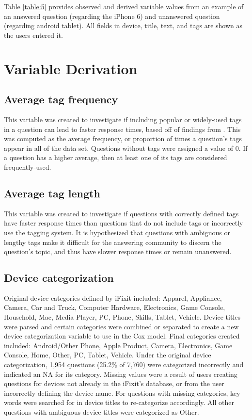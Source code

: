 \documentclass[]{interact}\usepackage[]{graphicx}\usepackage[]{color}
\begin{document}
Table \ref{table:5} provides observed and derived variable values from an example of an answered question (regarding the iPhone 6) and unanswered question (regarding android tablet). All fields in device, title, text, and tags are shown as the users entered it. 


\section{Variable Derivation}

\subsection{Average tag frequency}

This variable was created to investigate if including popular or widely-used tags in a question can lead to faster response times, based off of findings from \cite{Bhat2014}. This was computed as the average frequency, or proportion of times a question's tags appear in all of the data set. Questions without tags were assigned a value of 0.  If a question has a higher average, then at least one of its tags are considered frequently-used.


\subsection{Average tag length}

This variable was created to investigate if questions with correctly defined tags have faster response times than questions that do not include tags or incorrectly use the tagging system. It is hypothesized that questions with ambiguous or lengthy tags make it difficult for the answering community to discern the question's topic, and thus have slower response times or remain unanswered. 


\subsection{Device categorization}

Original device categories defined by iFixit included: Apparel, Appliance, Camera, Car and Truck, Computer Hardware, Electronics, Game Console, Household, Mac, Media Player, PC, Phone, Skills, Tablet, Vehicle. Device titles were parsed and certain categories were combined or separated to create a new device categorization variable to use in the Cox model. Final categories created included: Android/Other Phone, Apple Product, Camera, Electronics, Game Console, Home, Other, PC, Tablet, Vehicle. Under the original device categorization, 1,954 questions (25.2\% of 7,760) were categorized incorrectly and indicated an NA for its category. Missing values were a result of users creating questions for devices not already in the iFixit's database, or from the user incorrectly defining the device name. For questions with missing categories, key words were searched for in device titles to re-categorize accordingly. All other questions with ambiguous device titles were categorized as Other. 
\end{document}
